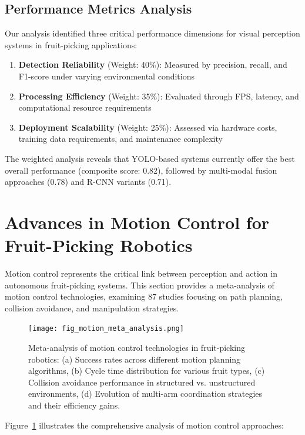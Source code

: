 \documentclass[a4paper,fleqn]{cas-dc}
\begin{document}
\subsection{Performance Metrics Analysis}

Our analysis identified three critical performance dimensions for visual perception systems in fruit-picking applications:

\begin{enumerate}
\item \textbf{Detection Reliability} (Weight: 40\%): Measured by precision, recall, and F1-score under varying environmental conditions
\item \textbf{Processing Efficiency} (Weight: 35\%): Evaluated through FPS, latency, and computational resource requirements
\item \textbf{Deployment Scalability} (Weight: 25\%): Assessed via hardware costs, training data requirements, and maintenance complexity
\end{enumerate}

The weighted analysis reveals that YOLO-based systems currently offer the best overall performance (composite score: 0.82), followed by multi-modal fusion approaches (0.78) and R-CNN variants (0.71).

\section{Advances in Motion Control for Fruit-Picking Robotics}

Motion control represents the critical link between perception and action in autonomous fruit-picking systems. This section provides a meta-analysis of motion control technologies, examining 87 studies focusing on path planning, collision avoidance, and manipulation strategies.

\begin{figure}[h!]
    \centering
    \texttt{[image: fig\_motion\_meta\_analysis.png]}
    \caption{Meta-analysis of motion control technologies in fruit-picking robotics: (a) Success rates across different motion planning algorithms, (b) Cycle time distribution for various fruit types, (c) Collision avoidance performance in structured vs. unstructured environments, (d) Evolution of multi-arm coordination strategies and their efficiency gains.}
    \label{fig:motion_meta}
\end{figure}

Figure~\ref{fig:motion_meta} illustrates the comprehensive analysis of motion control approaches:
\end{document}
